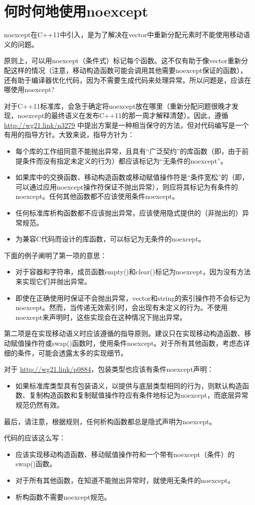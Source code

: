 \section{何时何地使用noexcept}
noexcept在C++11中引入，是为了解决在vector中重新分配元素时不能使用移动语义的问题。

原则上，可以用noexcept（条件式）标记每个函数。这不仅有助于像vector重新分配这样的情况（注意，移动构造函数可能会调用其他需要noexcept保证的函数），还有助于编译器优化代码，因为不需要生成代码来处理异常。所以问题是，应该在哪使用noexcept?

对于C++11标准库，会急于确定将noexcept放在哪里（重新分配问题很晚才发现，noexcept的最终语义在发布C++11的那一周才解释清楚）。因此，遵循 \url{http://wg21.link/n3279} 中提出方案是一种相当保守的方法，但对代码编写是一个有用的指导方针。大致来说，指导方针为：

\begin{itemize}
	\item 每个库的工作组同意不能抛出异常，且具有“广泛契约”的库函数（即，由于前提条件而没有指定未定义的行为）都应该标记为“无条件的noexcept”。
	\item 如果库中的交换函数、移动构造函数或移动赋值操作符是“条件宽松”的（即，可以通过应用noexcept操作符保证不抛出异常），则应将其标记为有条件的noexcept。任何其他函数都不应该使用条件noexcept。
	\item 任何标准库析构函数都不应该抛出异常，应该使用隐式提供的（非抛出的）异常规范。
	\item 为兼容C代码而设计的库函数，可以标记为无条件的noexcept。
\end{itemize}

下面的例子阐明了第一项的意思：

\begin{itemize}
	\item 对于容器和字符串，成员函数empty()和clear()标记为noexcept，因为没有方法来实现它们并抛出异常。
	\item 即使在正确使用时保证不会抛出异常，vector和string的索引操作符不会标记为noexcept。然而，当传递无效索引时，会出现有未定义的行为。不使用noexcept来声明时，这些实现会在这种情况下抛出异常。
\end{itemize}

第二项是在实现移动语义时应该遵循的指导原则。建议只在实现移动构造函数、移动赋值操作符或swap()函数时，使用条件noexcept。对于所有其他函数，考虑态详细的条件，可能会透露太多的实现细节。

对于 \url{http://wg21.link/p0884}，包装类型也应该有条件noexcept声明：

\begin{itemize}
	\item 如果标准库类型具有包装语义，以提供与底层类型相同的行为，则默认构造函数、复制构造函数和复制赋值操作符应有条件地标记为noexcept，而底层异常规范仍然有效。
\end{itemize}

最后，请注意，根据规则，任何析构函数都总是隐式声明为noexcept。

代码的应该这么写：

\begin{itemize}
	\item 应该实现移动构造函数、移动赋值操作符和一个带有noexcept（条件）的swap()函数。
	\item 对于所有其他函数，在知道不能抛出异常时，就使用无条件的noexcept。
	\item 析构函数不需要noexcept规范。
\end{itemize}







